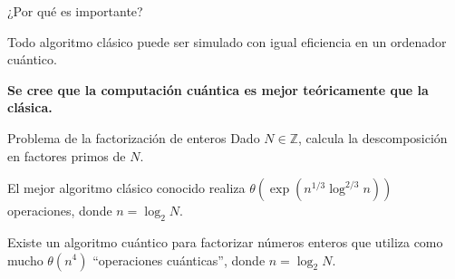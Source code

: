 \documentclass[11pt,compress]{beamer}
\begin{document}
\begin{frame}{¿Por qué es importante?}

 \begin{theorem}
   Todo algoritmo clásico puede ser simulado con igual eficiencia en un ordenador cuántico.
  \end{theorem}
  
  \begin{tcolorbox}[colback=ChetwodeBlue!10,colframe=ChetwodeBlue!60]
    \begin{center}
      {\large\color{TurkishRose}\textbf{Se cree que la computación cuántica es mejor teóricamente que la clásica.}}
    \end{center}
  \end{tcolorbox}

\begin{block}{Problema de la factorización de enteros}
   Dado $N \in \mathbb{Z}$, calcula la descomposición en factores primos de $N$. 
   
{\color{TurkishRose}El mejor algoritmo clásico conocido realiza $\theta(\exp(n^{1/3} \log^{2/3} n))$ operaciones, donde $n = \log_2 N$.}
\end{block}


\begin{theorem}
Existe un algoritmo cuántico para factorizar números enteros que utiliza como mucho $\theta(n^4)$ ``operaciones cuánticas'', donde $n = \log_2 N$.
\end{theorem}
\end{frame}
\end{document}

